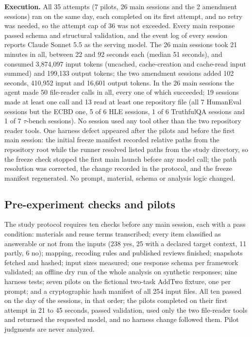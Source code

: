 \documentclass[10pt,conference]{IEEEtran}
\begin{document}
\textbf{Execution.} All 35 attempts (7 pilots, 26 main sessions and the 2 amendment sessions) ran on the same day, each completed on its first attempt, and no retry was needed, so the attempt cap of 36 was not exceeded. Every main response passed schema and structural validation, and the event log of every session reports Claude Sonnet 5.5 as the serving model. The 26 main sessions took 21 minutes in all, between 22 and 92 seconds each (median 51 seconds), and consumed 3,874,097 input tokens (uncached, cache-creation and cache-read input summed) and 199,133 output tokens; the two amendment sessions added 102 seconds, 410,952 input and 16,601 output tokens. In the 26 main sessions the agent made 50 file-reader calls in all, every one of which succeeded; 19 sessions made at least one call and 13 read at least one repository file (all 7 HumanEval sessions but the ECBD one, 5 of 6 HLE sessions, 1 of 6 TruthfulQA sessions and 1 of 7 $\tau$-bench sessions). No session used any tool other than the two repository reader tools. One harness defect appeared after the pilots and before the first main session: the initial freeze manifest recorded relative paths from the repository root while the runner resolved listed paths from the study directory, so the freeze check stopped the first main launch before any model call; the path resolution was corrected, the change recorded in the protocol, and the freeze manifest regenerated. No prompt, material, schema or analysis logic changed.

\subsection{Pre-experiment checks and pilots}
The study protocol requires ten checks before any main session, each with a pass condition: materials and reuse terms transcribed; every item classified as answerable or not from the inputs (238 yes, 25 with a declared target context, 11 partly, 6 no); mapping, recoding rules and published reviews finished; snapshots fetched and hashed; input sizes measured; one response schema per framework validated; an offline dry run of the whole analysis on synthetic responses; nine harness tests; seven pilots on the fictional two-task AddTwo fixture, one per prompt; and a cryptographic hash manifest of all 254 input files. All ten passed on the day of the sessions, in that order; the pilots completed on their first attempt in 21 to 45 seconds, passed validation, used only the two file-reader tools and returned the requested model, and no harness change followed them. Pilot judgments are never analyzed.
\end{document}
